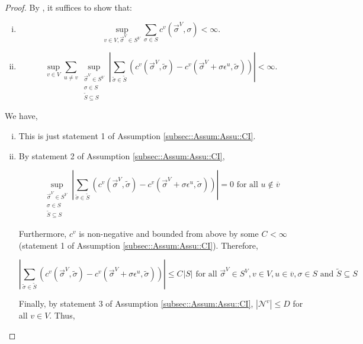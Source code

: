 \documentclass[12pt]{article}
\newcommand{\mc}{\mathcal}
\newcommand{\ov}{\overline}
\newcommand{\te}{\text}
\newcommand{\ep}{\epsilon}
\renewcommand{\v}{v}							%
\newcommand{\vv}{u}								%
\renewcommand{\S}{S}							%
\newcommand{\s}{\sigma}							%
\newcommand{\sv}{\vec{\s}}						%
\newcommand{\ev}{\ep}							%
\newcommand{\IGr}{c}							%
\newcommand{\neigh}{\mc{N}}						%
\newcommand{\vind}[1]{^{#1}}					%
\newcommand{\carp}[1]{^{#1}}					%
\newcommand{\vsi}[1]{^{#1}}						%
\newcommand{\cind}[1]{_{#1}}					%
\newcommand{\cl}{\ov}							%
\newcommand{\const}{C}							%
\newcommand{\degr}{D}							%
\renewcommand{\ss}{\tilde{\s}}					%
\renewcommand{\SS}{\tilde{\S}}					%
\newcommand{\indx}[1]{_{#1}}					%
\begin{document}
\begin{proof}
By \cite[Theorem 3.9 (a) and (b)]{Lig85}, it suffices to show that:

\begin{enumerate}[i)]
\item 

\[\sup_{\v \in V,\sv\cind{}\vsi{V} \in \S\carp{V}} \sum_{\s \in \S} \IGr\vind{\v}(\sv\cind{}\vsi{V},\s) < \infty.\]

\item 

\[\sup_{\v\in V}\sum_{\vv\neq \v} \sup_{\substack{\sv\cind{}\vsi{V} \in \S\carp{V}\\ \s\in \S\\ \SS \subseteq \S}} \left|\sum_{\ss \in \SS} (\IGr\vind{\v}(\sv\cind{}\vsi{V},\ss) - \IGr\vind{\v}(\sv\cind{}\vsi{V}+\s \ev\vind{\vv},\ss))\right| < \infty.\]
\end{enumerate}

We have,

\begin{enumerate}[i)]
\item This is just statement 1 of Assumption \ref{subsec::Assum:Assu::CI}.

\item By statement 2 of Assumption \ref{subsec::Assum:Assu::CI}, 

\[\sup_{\substack{\sv\cind{}\vsi{V} \in \S\carp{V}\\ \s\in \S\\ \SS\subseteq \S}} \left|\sum_{\ss \in \SS} (\IGr\vind{\v}(\sv\cind{}\vsi{V},\ss) - \IGr\vind{\v}(\sv\cind{}\vsi{V}+\s \ev\vind{\vv},\ss))\right| = 0 \te{ for all } \vv \notin \cl{\v}\]

Furthermore, \(\IGr\vind{\v}\) is non-negative and bounded from above by some \(\const\indx{} < \infty\) (statement 1 of Assumption \ref{subsec::Assum:Assu::CI}). Therefore, 

\[\left|\sum_{\ss \in \SS} (\IGr\vind{\v}(\sv\cind{}\vsi{V},\ss) - \IGr\vind{\v}(\sv\cind{}\vsi{V}+\s\ev\vind{\vv},\ss))\right| \leq \const\indx{}|\S| \te{ for all } \sv\cind{}\vsi{V} \in \S\carp{V},\v \in V, \vv \in \cl{\v}, \s \in \S \te{ and } \SS\subseteq \S\]

Finally, by statement 3 of Assumption \ref{subsec::Assum:Assu::CI}, \(|\neigh\vind{\v}| \leq \degr\) for all \(\v \in V\). Thus,


\end{enumerate}
\end{proof}
\end{document}
